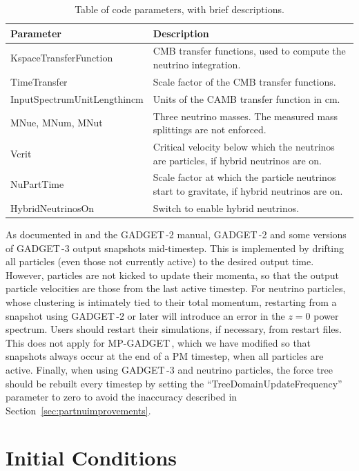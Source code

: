 \documentclass[useAMS, usenatbib]{mnras}
\newcommand{\gadget}{{\small GADGET\,}}
\begin{document}
\begin{table}
\begin{center}
\begin{tabular}{|l|l|}
\hline
    Parameter & Description \\
\hline
KspaceTransferFunction   & CMB transfer functions, used to compute the neutrino integration. \\
TimeTransfer             & Scale factor of the CMB transfer functions. \\
InputSpectrumUnitLengthincm   & Units of the CAMB transfer function in cm. \\
MNue, MNum, MNut &  Three neutrino masses. The measured mass splittings are not enforced. \\
Vcrit            & Critical velocity below which the neutrinos are particles, if hybrid neutrinos are on. \\
NuPartTime       & Scale factor at which the particle neutrinos start to gravitate, if hybrid neutrinos are on. \\
HybridNeutrinosOn       & Switch to enable hybrid neutrinos. \\
\hline
\end{tabular}
\end{center}
\caption{Table of code parameters, with brief descriptions.}
\label{tab:parameters}
\end{table}

As documented in \cite{Springel_2005} and the \gadget-2 manual, \gadget-2 and some versions of \gadget-3 output snapshots mid-timestep. This is implemented by drifting all particles (even those not currently active) to the desired output time. However, particles are not kicked to update their momenta, so that the output particle velocities are those from the last active timestep. For neutrino particles, whose clustering is intimately tied to their total momentum, restarting from a snapshot using \gadget-2 or later will introduce an error in the $z=0$ power spectrum. Users should restart their simulations, if necessary, from restart files. This does not apply for MP-\gadget, which we have modified so that snapshots always occur at the end of a PM timestep, when all particles are active. Finally, when using \gadget-3 and neutrino particles, the force tree should be rebuilt every timestep by setting the ``TreeDomainUpdateFrequency'' parameter to zero to avoid the inaccuracy described in Section~\ref{sec:partnuimprovements}.


\section{Initial Conditions}
\label{sec:initcond}
\end{document}

